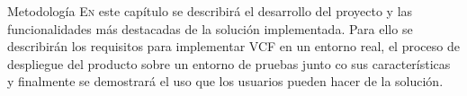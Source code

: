 \begin{chapter}{Metodología}
\label{chap:Metodologia}
\lettrine{E}{n} este capítulo se describirá el desarrollo del proyecto y las funcionalidades más destacadas de la solución implementada. Para ello se describirán los requisitos para implementar VCF en un entorno real, el proceso de despliegue del producto sobre un entorno de pruebas junto co sus características y finalmente se demostrará el uso que los usuarios pueden hacer de la solución.

%
% 


%
%

\end{chapter}